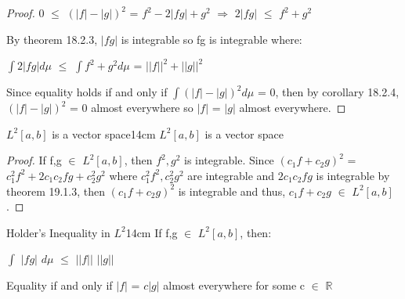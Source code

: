     \begin{proof}
        0 $\leq$ $(|f| - |g|)^2$
        = $f^2 - 2|fg| + g^2$
        \hspace{0.5cm}
        $\Rightarrow$
        \hspace{0.5cm}
        $2|fg|$ $\leq$ $f^2 + g^2$

        By {\color{red} theorem 18.2.3}, $|fg|$ is integrable so fg is integrable
        where:
        
        \hspace{0.5cm}
        $\int 2|fg| d\mu$
        $\leq$ $\int f^2 + g^2 d\mu$
        = $||f||^2 + ||g||^2$

        Since equality holds if and only if $\int (|f| - |g|)^2 d\mu$ = 0,
        then by {\color{orange} corollary 18.2.4}, $(|f| - |g|)^2$ = 0
        almost everywhere so $|f|$ = $|g|$ almost everywhere.
    \end{proof}

    \vspace{0.5cm}



    \begin{wtheorem}{$L^2[a,b]$ is a vector space}{14cm}
        $L^2[a,b]$ is a vector space
    \end{wtheorem}

    \begin{proof}
        If f,g $\in$ $L^2[a,b]$, then $f^2,g^2$ is integrable.
        Since $(c_1f+c_2g)^2$ = $c_1^2f^2 + 2c_1c_2fg + c_2^2g^2$
        where $c_1^2f^2,c_2^2g^2$ are integrable and $2c_1c_2fg$
        is integrable by {\color{red} theorem 19.1.3}, then
        $(c_1f+c_2g)^2$ is integrable and thus,
        $c_1f+c_2g$ $\in$ $L^2[a,b]$.
    \end{proof}

    \vspace{0.5cm}



    \begin{wtheorem}{Holder's Inequality in $L^2$}{14cm}
        If f,g $\in$ $L^2[a,b]$, then:

        \hspace{0.5cm}
        $\int$ $|fg|$ $d\mu$ $\leq$ $||f||$ $||g||$

        Equality if and only if
        $|f|$ = $c|g|$ almost everywhere for some c $\in$ $\mathbb{R}$
    \end{wtheorem}

